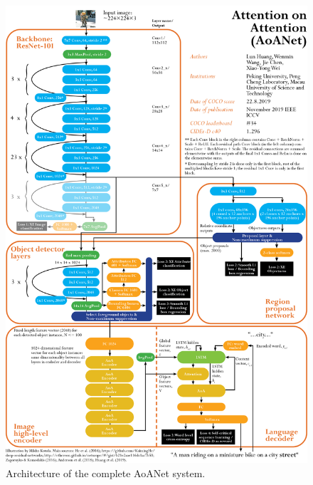 \documentclass[english,twoside,openright]{HYgraduMLDS}
\begin{document}
\pagebreak
\begin{figure}[H] 
\centering
\includegraphics[width=1.0\textwidth]{./images-indesign/Architecture_AoA.png}
\caption{Architecture of the complete AoANet system.}
\label{fig:architecture_AoA} 
\end{figure}
\end{document}

